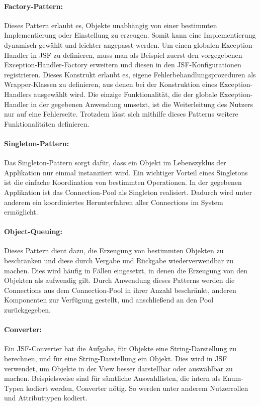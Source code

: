 \documentclass{article}
\begin{document}
\paragraph{Factory-Pattern:} 
Dieses Pattern erlaubt es, Objekte unabhängig von einer bestimmten Implementierung oder Einstellung zu erzeugen. Somit kann eine Implementierung dynamisch gewählt und leichter angepasst werden. 
Um einen globalen Exception-Handler in JSF zu definieren, muss man als Beispiel zuerst den vorgegebenen Exception-Handler-Factory erweitern und diesen in den JSF-Konfigurationen registrieren. 
Dieses Konstrukt erlaubt es, eigene Fehlerbehandlungsprozeduren als Wrapper-Klassen zu definieren, aus denen bei der Konstruktion eines Exception-Handlers ausgewählt wird. 
Die einzige Funktionalität, die der globale Exception-Handler in der gegebenen Anwendung umsetzt, ist die Weiterleitung des Nutzers nur auf eine Fehlerseite. Trotzdem lässt sich mithilfe dieses Patterns weitere Funktionalitäten definieren. 

\paragraph{Singleton-Pattern:} 
Das Singleton-Pattern sorgt dafür, dass ein Objekt im Lebenszyklus der Applikation nur einmal instanziiert wird. Ein wichtiger Vorteil eines Singletons ist die einfache Koordination von bestimmten Operationen. 
In der gegebenen Applikation ist das Connection-Pool als Singleton realisiert. Dadurch wird unter anderem ein koordiniertes Herunterfahren aller Connections im System ermöglicht.

\paragraph{Object-Queuing:} 
Dieses Pattern dient dazu, die Erzeugung von bestimmten Objekten zu beschränken und diese durch Vergabe und Rückgabe wiederverwendbar zu machen. Dies wird häufig in Fällen eingesetzt, in denen die Erzeugung von den Objekten als aufwendig gilt. 
Durch Anwendung dieses Patterns werden die Connections aus dem Connection-Pool in ihrer Anzahl beschränkt, anderen Komponenten zur Verfügung gestellt, und anschließend an den Pool zurückgegeben.

\paragraph{Converter:} 
Ein JSF-Converter hat die Aufgabe, für Objekte eine String-Darstellung zu berechnen, und für eine String-Darstellung ein Objekt. Dies wird in JSF verwendet, um Objekte in der View besser darstellbar oder auswählbar zu machen. 
Beispielsweise sind für sämtliche Auswahllisten, die intern als Enum-Typen kodiert werden, Converter nötig. So werden unter anderem Nutzerrollen und Attributtypen kodiert.
\end{document}
